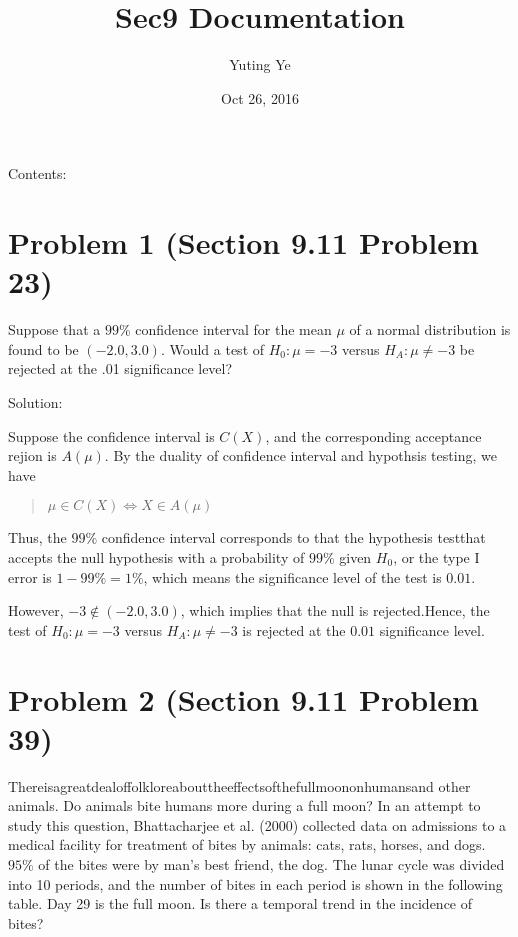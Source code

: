 \documentclass[letterpaper,10pt,english]{sphinxmanual}
\title{Sec9 Documentation}
\date{Oct 26, 2016}
\author{Yuting Ye}
\begin{document}
\maketitle
\tableofcontents
{}\label{index::doc}


Contents:


\chapter{Problem 1 (Section 9.11 Problem 23)}
\label{P1:stat135-section-9}\label{P1::doc}\label{P1:problem-1-section-9-11-problem-23}\label{P1:problem1}
Suppose that a \(99\%\) confidence interval for the mean \(\mu\) of a normal distribution is found to be \((-2.0, 3.0)\). Would a test of \(H_0: \mu = -3\) versus \(H_A: \mu \neq -3\) be rejected at the .01 significance level?

Solution:

Suppose the confidence interval is \(C(X)\), and the corresponding acceptance
rejion is \(A(\mu)\). By the duality of confidence interval and hypothsis testing, we have
\begin{quote}

\(\mu \in C(X) \Leftrightarrow X \in A(\mu)\)
\end{quote}

Thus, the \(99\%\) confidence interval corresponds to that the hypothesis testthat accepts the null hypothesis with a probability of \(99\%\) given \(H_0\), or the type I error is \(1 - 99\% = 1\%\), which means the significance level of the test is \(0.01\).

However, \(-3 \not \in (-2.0, 3.0)\), which implies that the null is rejected.Hence, the test of \(H_0: \mu = -3\) versus \(H_A: \mu \neq -3\) is rejected at the \(0.01\) significance level.


\chapter{Problem 2 (Section 9.11 Problem 39)}
\label{P2:problem-2-section-9-11-problem-39}\label{P2::doc}\label{P2:problem2}
Thereisagreatdealoffolkloreabouttheeffectsofthefullmoononhumansand other animals. Do animals bite humans more during a full moon? In an attempt to study this question, Bhattacharjee et al. (2000) collected data on admissions to a medical facility for treatment of bites by animals: cats, rats, horses, and dogs. \(95\%\) of the bites were by man’s best friend, the dog. The lunar cycle was divided into 10 periods, and the number of bites in each period is shown in the following table. Day 29 is the full moon. Is there a temporal trend in the incidence of bites?
\end{document}
